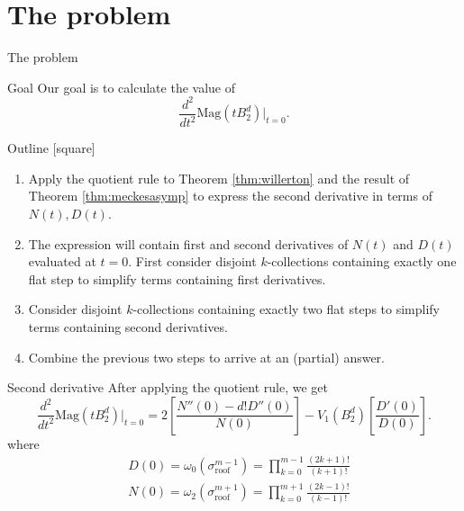 \documentclass[12pt]{beamer}
\begin{document}
\section{The problem}

\begin{frame}[allowframebreaks]{The problem}

\begin{block}{Goal}
Our goal is to calculate the value of
\begin{equation*}
\frac{d^2}{dt^2}\text{Mag}\left(tB_2^d\right)\big\vert_{t=0}.
\end{equation*}
\end{block}

\framebreak

\begin{block}{Outline}
[square]
\begin{enumerate}
\item Apply the quotient rule to Theorem \ref{thm:willerton} and the result of Theorem \ref{thm:meckesasymp} to express the second derivative in terms of $N(t),D(t)$.
\item The expression will contain first and second derivatives of $N(t)$ and $D(t)$ evaluated at $t = 0$. First consider disjoint $k$-collections containing exactly one flat step to simplify terms containing first derivatives.
\item Consider disjoint $k$-collections containing exactly two flat steps to simplify terms containing second derivatives.
\item Combine the previous two steps to arrive at an (partial) answer.
\end{enumerate}
\end{block}

\end{frame}

\begin{frame}{Second derivative}
After applying the quotient rule, we get
\begin{equation*}
\frac{d^2}{dt^2}\text{Mag}\left(tB_2^d\right)\big\vert_{t=0} = 2\left[\frac{N''(0)-d!D''(0)}{N(0)}\right] - V_1\left(B_2^d\right)\left[\frac{D'(0)}{D(0)}\right].
\end{equation*}
where
\begin{align*}
&D(0) = \omega_0\left(\sigma_\text{roof}^{m-1}\right) = \prod\limits_{k=0}^{m-1}\frac{(2k+1)!}{(k+1)!} \\
&N(0) = \omega_2\left(\sigma_\text{roof}^{m+1}\right) = \prod\limits_{k=0}^{m+1}\frac{(2k-1)!}{(k-1)!}
\end{align*}

\end{frame}
\end{document}
